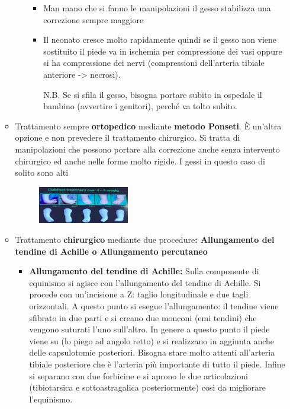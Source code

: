 \begin{itemize}
\begin{itemize}
\begin{itemize}
			\begin{itemize}
			\item
  			Man mano che si fanno le manipolazioni il gesso stabilizza una correzione sempre maggiore
			\item
  			Il neonato cresce molto rapidamente quindi se il gesso non viene sostituito il piede va in ischemia per compressione dei vasi oppure si ha compressione dei nervi (compressioni dell'arteria tibiale anteriore -> necrosi).

			N.B. Se si sfila il gesso, bisogna portare subito in ospedale il bambino (avvertire i genitori), perché va tolto subito.
			\end{itemize}
		\end{itemize}

\item
  Trattamento sempre \textbf{ortopedico} mediante \textbf{metodo Ponseti}. È un'altra opzione e non prevedere il trattamento chirurgico. Si tratta di manipolazioni che possono portare alla correzione anche senza intervento chirurgico ed anche nelle forme molto rigide. I gessi in questo caso di solito sono alti
  
\begin{figure}[!ht]
\centering
\includegraphics[width=0.4\textwidth]{016/image18.png}
\end{figure}

\item
  Trattamento \textbf{chirurgico} mediante due procedure\textbf{: Allungamento del tendine di Achille o Allungamento percutaneo}

	\begin{itemize}
\item
  \textbf{Allungamento del tendine di Achille:} Sulla componente di equinismo si agisce con l'allungamento del tendine di Achille. Si procede con un'incisione a Z: taglio longitudinale e due tagli orizzontali. A questo punto si esegue l'allungamento: il tendine viene sfibrato in due parti e si creano due monconi (emi tendini) che vengono suturati l'uno sull'altro. In genere a questo punto il piede viene su (lo piego ad angolo retto) e si realizzano in aggiunta anche delle capsulotomie posteriori. Bisogna stare molto attenti all'arteria tibiale posteriore che è l'arteria più importante di tutto il piede. Infine si separano con due forbicine e si aprono le due articolazioni (tibiotarsica e sottoastragalica posteriormente) così da migliorare l'equinismo.


\end{itemize}
\end{itemize}
\end{itemize}
